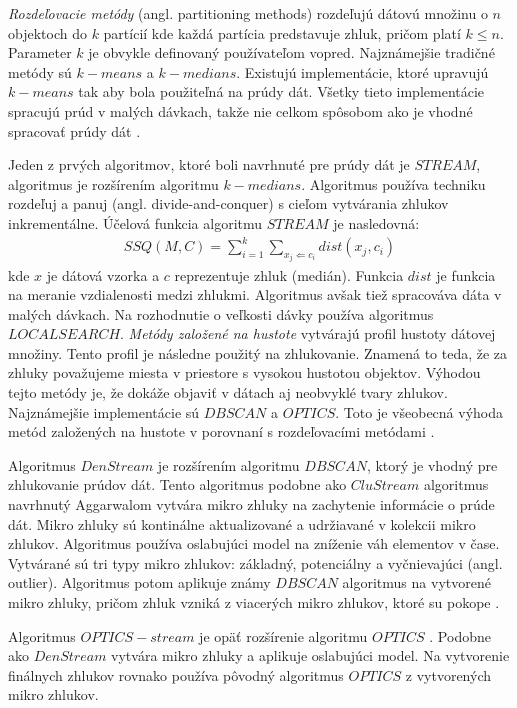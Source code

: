 \textit{Rozdeľovacie metódy} (angl. partitioning methods) rozdeľujú dátovú množinu o $n$ objektoch do $k$ partícií kde každá partícia predstavuje zhluk, pričom platí $k\leq n$. Parameter $k$ je obvykle definovaný používateľom vopred. Najznámejšie tradičné metódy sú $k-means$ a $k-medians$. Existujú implementácie, ktoré upravujú $k-means$ tak aby bola použiteľná na prúdy dát. Všetky tieto implementácie spracujú prúd v malých dávkach, takže nie celkom spôsobom ako je vhodné spracovať prúdy dát \citep{gaber2005mining}.
\par
Jeden z prvých algoritmov, ktoré boli navrhnuté pre prúdy dát je $STREAM$, algoritmus je rozšírením algoritmu $k-medians$. Algoritmus používa techniku rozdeľuj a panuj (angl. divide-and-conquer) s cieľom vytvárania zhlukov inkrementálne. Účelová funkcia algoritmu $STREAM$ je nasledovná:
\begin{align*}
SSQ(M,C) = \sum_{i=1}^{k} \sum_{x_j\Leftarrow c_i} dist(x_j, c_i)
\end{align*}
kde $x$ je dátová vzorka a $c$ reprezentuje zhluk (medián). Funkcia $dist$ je funkcia na meranie vzdialenosti medzi zhlukmi. Algoritmus avšak tiež spracováva dáta v malých dávkach. Na rozhodnutie o veľkosti dávky používa algoritmus $LOCALSEARCH$.
\textit{Metódy založené na hustote} vytvárajú profil hustoty dátovej množiny. Tento profil je následne použitý na zhlukovanie. Znamená to teda, že za zhluky považujeme miesta v priestore s vysokou hustotou objektov. Výhodou tejto metódy je, že dokáže objaviť v dátach aj neobvyklé tvary zhlukov. Najznámejšie implementácie sú $DBSCAN$ a $OPTICS$. Toto je všeobecná výhoda metód založených na hustote v porovnaní s rozdeľovacími metódami \citep{han2011data}.
\par
Algoritmus $DenStream$ je rozšírením algoritmu $DBSCAN$, ktorý je vhodný pre zhlukovanie prúdov dát. Tento algoritmus podobne ako $CluStream$ algoritmus navrhnutý Aggarwalom \citep{aggarwal2003framework} vytvára mikro zhluky na zachytenie informácie o prúde dát. Mikro zhluky sú kontinálne aktualizované a udržiavané v kolekcii mikro zhlukov. Algoritmus používa oslabujúci model na zníženie váh elementov v čase. Vytvárané sú tri typy mikro zhlukov: základný, potenciálny a vyčnievajúci (angl. outlier). Algoritmus potom aplikuje známy $DBSCAN$ algoritmus na vytvorené mikro zhluky, pričom zhluk vzniká z viacerých mikro zhlukov, ktoré su pokope \citep{nguyen2015survey}.
\par
Algoritmus $OPTICS-stream$ je opäť rozšírenie algoritmu $OPTICS$ \citep{ankerst1999optics}. Podobne ako $DenStream$ vytvára mikro zhluky a aplikuje oslabujúci model. Na vytvorenie finálnych zhlukov rovnako používa pôvodný algoritmus $OPTICS$ z vytvorených mikro zhlukov.

